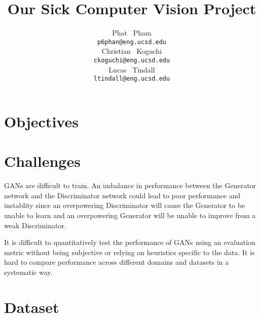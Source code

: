 \documentclass{article} %
\title{Our Sick Computer Vision Project}
\author{
Phat ~Pham\\
\texttt{p6phan@eng.ucsd.edu} \\ \And
Christian ~Koguchi\\
\texttt{ckoguchi@eng.ucsd.edu} \\ \And
Lucas ~Tindall\\
\texttt{ltindall@eng.ucsd.edu} \\ 
}
\begin{document}
\maketitle

\begin{abstract}

\end{abstract}

\section{Objectives}



\section{Challenges}

GANs are difficult to train.  An imbalance in performance between the Generator network and the Discriminator network could lead to poor performance and instablity since an overpowering Discriminator will cause the Generator to be unable to learn and an overpowering Generator will be unable to improve from a weak Discriminator. 

It is difficult to quantitatively test the performance of GANs using an evaluation metric without being subjective or relying on heuristics specific to the data.  It is hard to compare performance across different domains and datasets in a systematic way.  




\section{Dataset}





\end{document}
